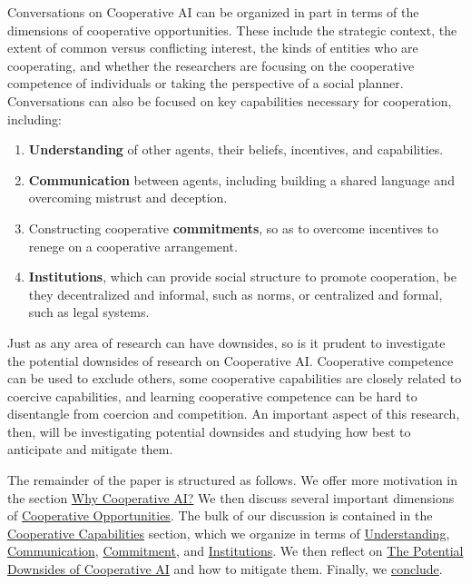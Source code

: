 \documentclass[11pt, a4paper, logo, onecolumn, nonumbering]{deepmind}
\begin{document}
Conversations on Cooperative AI can be organized in part in terms of the dimensions of cooperative opportunities. These include the strategic context, the extent of common versus conflicting interest, the kinds of entities who are cooperating, and whether the researchers are focusing on the cooperative competence of individuals or taking the perspective of a social planner. Conversations can also be focused on key capabilities necessary for cooperation, including:
\vspace{-4mm}
\begin{enumerate}
    \item \textbf{Understanding} of other agents, their beliefs, incentives, and capabilities.
    \item \textbf{Communication} between agents, including building a shared language and overcoming mistrust and deception.
    \item Constructing cooperative \textbf{commitments}, so as to overcome incentives to renege on a cooperative arrangement.
    \item \textbf{Institutions}, which can provide social structure to promote cooperation, be they decentralized and informal, such as norms, or centralized and formal, such as legal systems. 
\end{enumerate} 


Just as any area of research can have downsides, so is it prudent to investigate the potential downsides of research on Cooperative AI. Cooperative competence can be used to exclude others, some cooperative capabilities are closely related to coercive capabilities, and learning cooperative competence can be hard to disentangle from coercion and competition. An important aspect of this research, then, will be investigating potential downsides and studying how best to anticipate and mitigate them. 


The remainder of the paper is structured as follows. 
We offer more motivation in the section \hyperref[section:why]{Why Cooperative AI?} 
We then discuss several important dimensions of \hyperref[section:opportunities]{Cooperative Opportunities}. 
The bulk of our discussion is contained in the \hyperref[section:capabilities]{Cooperative Capabilities} section, which we organize in terms of 
\hyperref[section:understanding]{Understanding}, \hyperref[section:communication]{Communication}, \hyperref[section:commitment]{Commitment}, and \hyperref[section:institutions]{Institutions}. 
We then reflect on \hyperref[section:downsides]{The Potential Downsides of Cooperative AI}
and how to mitigate them. Finally, we \hyperref[section:conclusion]{conclude}.
\end{document}

